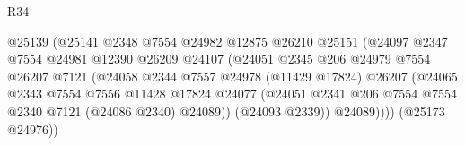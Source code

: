 \begin{lexlean}{R34}
\begin{coremodule}
                                          @25139
                                          (@25141
                                            @2348
                                            @7554
                                            @24982
                                            @12875
                                            @26210
                                            @25151
                                            (@24097
                                              @2347
                                              @7554
                                              @24981
                                              @12390
                                              @26209
                                              @24107
                                              (@24051
                                                @2345
                                                @206
                                                @24979
                                                @7554
                                                @26207
                                                @7121
                                                (@24058
                                                  @2344
                                                  @7557
                                                  @24978
                                                  (@11429 @17824)
                                                  @26207
                                                  (@24065
                                                    @2343
                                                    @7554
                                                    @7556
                                                    @11428
                                                    @17824
                                                    @24077
                                                    (@24051
                                                      @2341
                                                      @206
                                                      @7554
                                                      @7554
                                                      @2340
                                                      @7121
                                                      (@24086 @2340)
                                                      @24089))
                                                  (@24093 @2339))
                                                @24089))))
                                        (@25173 @24976))

\end{coremodule}
\end{lexlean}
